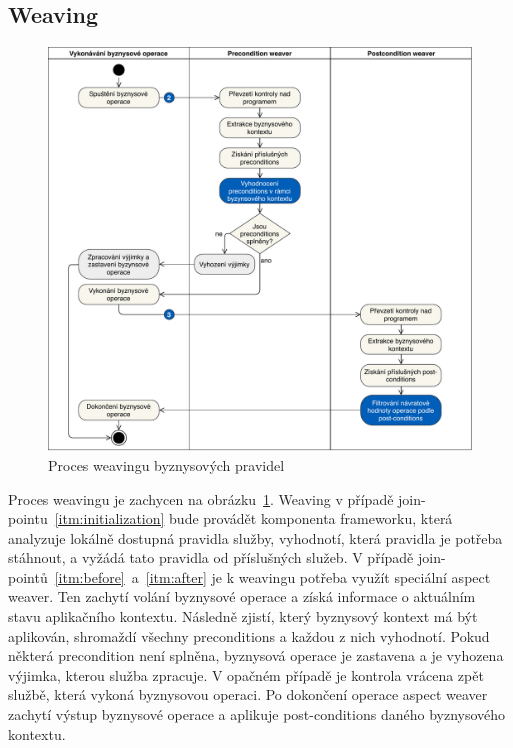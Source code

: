 \subsection{Weaving}

\begin{figure}
    \centering
    \includegraphics[keepaspectratio=true, width=0.9\linewidth]{figures/business-rules-weaver.pdf}
    \caption{Proces weavingu byznysov\'ych pravidel}
    \label{fig:business-rules-weaver}
\end{figure}

Proces weavingu je zachycen na obrázku~\ref{fig:business-rules-weaver}. Weaving v případě
join-pointu~\ref{itm:initialization} bude provádět komponenta frameworku, která
analyzuje lokálně dostupná pravidla služby, vyhodnotí, která pravidla je potřeba stáhnout,
a vyžádá tato pravidla od příslušných služeb. V případě join-pointů~\ref{itm:before}~a~\ref{itm:after}
je k weavingu potřeba využít speciální aspect weaver. Ten zachytí volání byznysové operace a získá
informace o aktuálním stavu aplikačního kontextu. Následně zjistí, který byznysový kontext má být aplikován,
shromaždí všechny preconditions a každou z nich vyhodnotí. Pokud některá precondition není splněna, byznysová
operace je zastavena a je vyhozena výjimka, kterou služba zpracuje. V opačném případě je kontrola vrácena zpět
službě, která vykoná byznysovou operaci. Po dokončení operace aspect weaver zachytí výstup byznysové
operace a aplikuje post-conditions daného byznysového kontextu.

